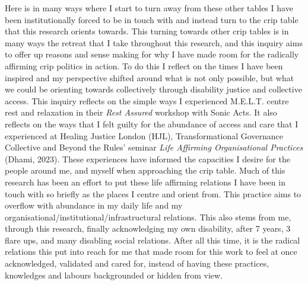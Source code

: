 Here is in many ways where I start to turn away from these other tables
I have been institutionally forced to be in touch with and instead turn
to the crip table that this research orients towards. This turning
towards other crip tables is in many ways the retreat that I take
throughout this research, and this inquiry aims to offer up reasons and
sense making for why I have made room for the radically affirming crip
politics in action. To do this I reflect on the times I have been
inspired and my perspective shifted around what is not only possible,
but what we could be orienting towards collectively through disability
justice and collective access. This inquiry reflects on the simple ways
I experienced M.E.L.T. centre rest and relaxation in their \emph{Rest
Assured} workshop with Sonic Acts. It also reflects on the ways that I
felt guilty for the abundance of access and care that I experienced at
Healing Justice London (HJL), Transformational Governance Collective and
Beyond the Rules' seminar \emph{Life Affirming Organisational Practices}
(Dhami, 2023). These experiences have informed the capacities I desire
for the people around me, and myself when approaching the crip table.
Much of this research has been an effort to put these life affirming
relations I have been in touch with so briefly as the places I centre
and orient from. This practice aims to overflow with abundance in my
daily life and my organisational/institutional/infrastructural
relations. This also stems from me, through this research, finally
acknowledging my own disability, after 7 years, 3 flare ups, and many
disabling social relations. After all this time, it is the radical
relations this put into reach for me that made room for this work to
feel at once acknowledged, validated and cared for, instead of having
these practices, knowledges and labours backgrounded or hidden from
view.

